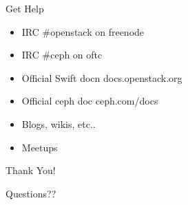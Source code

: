 \documentclass{beamer}
\begin{document}
\begin{frame}{Get Help}
\begin{itemize}
 \item IRC \#openstack on freenode
 \item IRC \#ceph on oftc
 \item Official Swift docn docs.openstack.org
 \item Official ceph doc  ceph.com/docs
 \item Blogs, wikis, etc..
 \item Meetups
\end{itemize}
\end{frame}

\begin{frame}{Thank You!}
\begin{center}
Questions??
\end{center}
\end{frame}
\end{document}
